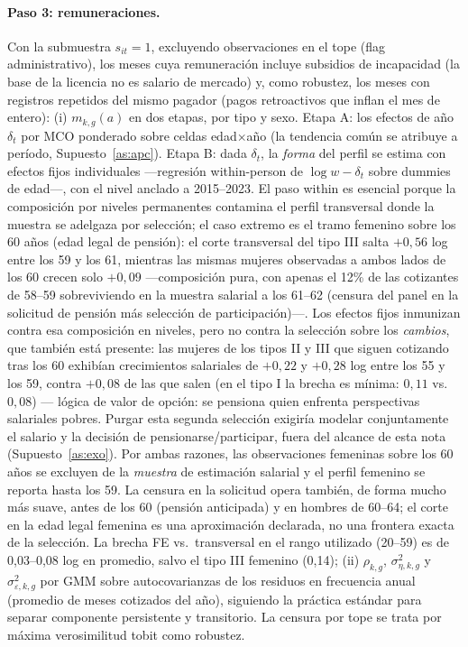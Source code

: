 \documentclass[11pt]{article}
\begin{document}
\paragraph{Paso 3: remuneraciones.} Con la submuestra $s_{it}=1$,
excluyendo observaciones en el tope (flag administrativo), los meses cuya
remuneración incluye subsidios de incapacidad (la base de la licencia no es
salario de mercado) y, como robustez, los meses con registros repetidos del
mismo pagador (pagos retroactivos que inflan el mes de entero): (i)
$m_{k,g}(a)$ en dos etapas, por tipo y sexo. Etapa A: los efectos de año
$\delta_t$ por MCO ponderado sobre celdas edad$\times$año (la tendencia
común se atribuye a período, Supuesto~\ref{as:apc}). Etapa B: dada
$\delta_t$, la \emph{forma} del perfil se estima con efectos fijos
individuales —regresión within-person de $\log w - \delta_t$ sobre dummies
de edad—, con el nivel anclado a 2015--2023. El paso within es esencial
porque la composición por niveles permanentes contamina el perfil
transversal donde la muestra se adelgaza por selección; el caso extremo es
el tramo femenino sobre los 60 años (edad legal de pensión): el corte
transversal del tipo III salta $+0{,}56$ log entre los 59 y los 61,
mientras las mismas mujeres observadas a ambos lados de los 60 crecen solo
$+0{,}09$ —composición pura, con apenas el 12\% de las cotizantes de
58--59 sobreviviendo en la muestra salarial a los 61--62 (censura del panel
en la solicitud de pensión más selección de participación)—. Los efectos
fijos inmunizan contra esa composición en niveles, pero no contra la
selección sobre los \emph{cambios}, que también está presente: las mujeres
de los tipos II y III que siguen cotizando tras los 60 exhibían
crecimientos salariales de $+0{,}22$ y $+0{,}28$ log entre los 55 y los 59,
contra $+0{,}08$ de las que salen (en el tipo I la brecha es mínima:
$0{,}11$ vs.\ $0{,}08$) — lógica de valor de opción: se pensiona quien
enfrenta perspectivas salariales pobres. Purgar esta segunda selección
exigiría modelar conjuntamente el salario y la decisión de
pensionarse/participar, fuera del alcance de esta nota (Supuesto~\ref{as:exo}).
Por ambas razones, las observaciones femeninas sobre los 60 años se
excluyen de la \emph{muestra} de estimación salarial y el perfil femenino
se reporta hasta los 59. La censura en la solicitud opera también, de forma
mucho más suave, antes de los 60 (pensión anticipada) y en hombres de
60--64; el corte en la edad legal femenina es una aproximación declarada,
no una frontera exacta de la selección. La brecha FE vs.\ transversal en el
rango utilizado (20--59) es de 0,03--0,08 log en promedio, salvo el tipo
III femenino (0,14);
(ii) $\rho_{k,g}$, $\sigma^2_{\eta,k,g}$ y $\sigma^2_{\varepsilon,k,g}$ por GMM sobre
autocovarianzas de los residuos en frecuencia anual (promedio de meses
cotizados del año), siguiendo la práctica estándar para separar componente
persistente y transitorio. La censura por tope se trata por máxima
verosimilitud tobit como robustez.
\end{document}

